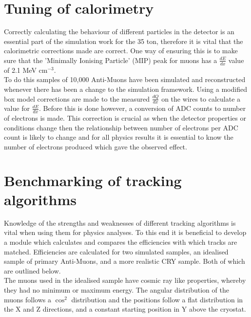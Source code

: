 \documentclass[11pt]{report} %
\begin{document}
{\section{Tuning of calorimetry}
Correctly calculating the behaviour of different particles in the detector is an essential part of the simulation work for the 35 ton, therefore it is vital that the calorimetric corrections made are correct. One way of ensuring this is to make sure that the 'Minimally Ionising Particle' (MIP) peak for muons has a \( \frac{dE}{dx} \) value of 2.1 MeV cm\(^{-3}\). \\

To do this samples of 10,000 Anti-Muons have been simulated and reconstructed whenever there has been a change to the simulation framework. Using a modified box model \cite{ModBox} corrections are made to the measured \( \frac{dQ}{dx} \) on the wires to calculate a value for \( \frac{dE}{dx} \). Before this is done however, a conversion of ADC counts to number of electrons is made. This correction is crucial as when the detector properties or conditions change then the relationship between number of electrons per ADC count is likely to change and for all physics results it is essential to know the number of electrons produced which gave the observed effect. 

\section{Benchmarking of tracking algorithms}
Knowledge of the strengths and weaknesses of different tracking algorithms is vital when using them for physics analyses. To this end it is beneficial to develop a module which calculates and compares the efficiencies with which tracks are matched. Efficiencies are calculated for two simulated samples, an idealised sample of primary Anti-Muons, and a more realistic CRY sample. Both of which are outlined below. \\ 

The muons used in the idealised sample have cosmic ray like properties, whereby they had no minimum or maximum energy. The angular distribution of the muons follows a $\cos^2$ distribution and the positions follow a flat distribution in the X and Z directions, and a constant starting position in Y above the cryostat. \\

}
\end{document}
